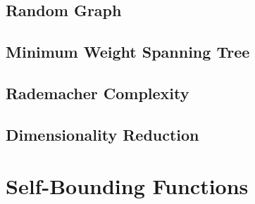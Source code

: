 \documentclass[11pt]{article}
\begin{document}
\subsection{Random Graph}
\subsection{Minimum Weight Spanning Tree}
\subsection{Rademacher Complexity}
\subsection{Dimensionality Reduction}

\section{Self-Bounding Functions}
\end{document}
